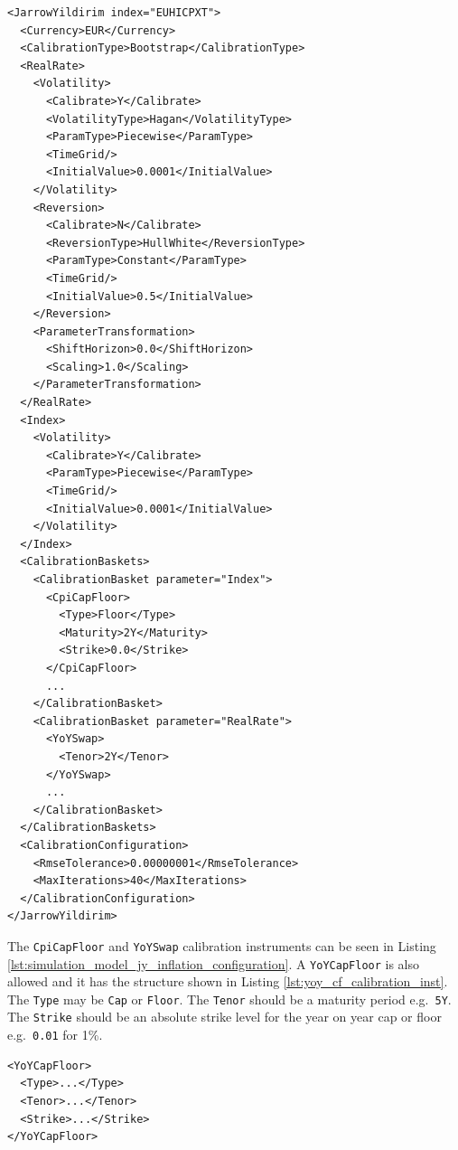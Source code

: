 \begin{listing}[H]
\begin{verbatim}
<JarrowYildirim index="EUHICPXT">
  <Currency>EUR</Currency>
  <CalibrationType>Bootstrap</CalibrationType>
  <RealRate>
    <Volatility>
      <Calibrate>Y</Calibrate>
      <VolatilityType>Hagan</VolatilityType>
      <ParamType>Piecewise</ParamType>
      <TimeGrid/>
      <InitialValue>0.0001</InitialValue>
    </Volatility>
    <Reversion>
      <Calibrate>N</Calibrate>
      <ReversionType>HullWhite</ReversionType>
      <ParamType>Constant</ParamType>
      <TimeGrid/>
      <InitialValue>0.5</InitialValue>
    </Reversion>
    <ParameterTransformation>
      <ShiftHorizon>0.0</ShiftHorizon>
      <Scaling>1.0</Scaling>
    </ParameterTransformation>
  </RealRate>
  <Index>
    <Volatility>
      <Calibrate>Y</Calibrate>
      <ParamType>Piecewise</ParamType>
      <TimeGrid/>
      <InitialValue>0.0001</InitialValue>
    </Volatility>
  </Index>
  <CalibrationBaskets>
    <CalibrationBasket parameter="Index">
      <CpiCapFloor>
        <Type>Floor</Type>
        <Maturity>2Y</Maturity>
        <Strike>0.0</Strike>
      </CpiCapFloor>
      ...
    </CalibrationBasket>
    <CalibrationBasket parameter="RealRate">
      <YoYSwap>
        <Tenor>2Y</Tenor>
      </YoYSwap>
      ...
    </CalibrationBasket>
  </CalibrationBaskets>
  <CalibrationConfiguration>
    <RmseTolerance>0.00000001</RmseTolerance>
    <MaxIterations>40</MaxIterations>
  </CalibrationConfiguration>
</JarrowYildirim>
\end{verbatim}
\caption{Simulation model JY inflation component configuration}
\label{lst:simulation_model_jy_inflation_configuration}
\end{listing}

The \lstinline!CpiCapFloor! and \lstinline!YoYSwap! calibration instruments can be seen in Listing \ref{lst:simulation_model_jy_inflation_configuration}. A \lstinline!YoYCapFloor! is
also allowed and it has the structure shown in Listing \ref{lst:yoy_cf_calibration_inst}. The \lstinline!Type! may be \lstinline!Cap! or \lstinline!Floor!. The \lstinline!Tenor! should
be a maturity period e.g.\ \lstinline!5Y!. The \lstinline!Strike! should be an absolute strike level for the year on year cap or floor e.g.\ \lstinline!0.01! for 1\%.

\begin{listing}[H]
\begin{verbatim}
<YoYCapFloor>
  <Type>...</Type>
  <Tenor>...</Tenor>
  <Strike>...</Strike>
</YoYCapFloor>
\end{verbatim}
\caption{Layout for \lstinline!YoYCapFloor! calibration instrument.}
\label{lst:yoy_cf_calibration_inst}
\end{listing}

